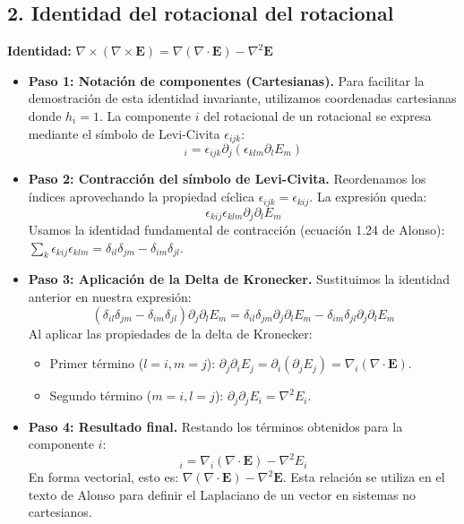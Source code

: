 \documentclass[a4paper]{article}
\begin{document}
\subsection*{2. Identidad del rotacional del rotacional}
\textbf{Identidad:} $\nabla \times (\nabla \times \mathbf{E}) = \nabla(\nabla \cdot \mathbf{E}) - \nabla^2 \mathbf{E}$

\begin{itemize}
    \item \textbf{Paso 1: Notación de componentes (Cartesianas).}
    Para facilitar la demostración de esta identidad invariante, utilizamos coordenadas cartesianas donde $h_i = 1$. La componente $i$ del rotacional de un rotacional se expresa mediante el símbolo de Levi-Civita $\epsilon_{ijk}$:
    \begin{equation}
        [\nabla \times (\nabla \times \mathbf{E})]_i = \epsilon_{ijk} \partial_j (\epsilon_{klm} \partial_l E_m)
    \end{equation}

    \item \textbf{Paso 2: Contracción del símbolo de Levi-Civita.}
    Reordenamos los índices aprovechando la propiedad cíclica $\epsilon_{ijk} = \epsilon_{kij}$. La expresión queda:
    \begin{equation}
        \epsilon_{kij} \epsilon_{klm} \partial_j \partial_l E_m
    \end{equation}
    Usamos la identidad fundamental de contracción (ecuación 1.24 de Alonso): $\sum_k \epsilon_{kij} \epsilon_{klm} = \delta_{il}\delta_{jm} - \delta_{im}\delta_{jl}$.

    \item \textbf{Paso 3: Aplicación de la Delta de Kronecker.}
    Sustituimos la identidad anterior en nuestra expresión:
    \begin{equation}
        (\delta_{il}\delta_{jm} - \delta_{im}\delta_{jl}) \partial_j \partial_l E_m = \delta_{il}\delta_{jm} \partial_j \partial_l E_m - \delta_{im}\delta_{jl} \partial_j \partial_l E_m
    \end{equation}
    Al aplicar las propiedades de la delta de Kronecker:
    \begin{itemize}
        \item Primer término ($l=i, m=j$): $\partial_j \partial_i E_j = \partial_i (\partial_j E_j) = \nabla_i (\nabla \cdot \mathbf{E})$.
        \item Segundo término ($m=i, l=j$): $\partial_j \partial_j E_i = \nabla^2 E_i$.
    \end{itemize}

    \item \textbf{Paso 4: Resultado final.}
    Restando los términos obtenidos para la componente $i$:
    \begin{equation}
        [\nabla \times (\nabla \times \mathbf{E})]_i = \nabla_i (\nabla \cdot \mathbf{E}) - \nabla^2 E_i
    \end{equation}
    En forma vectorial, esto es: $\nabla(\nabla \cdot \mathbf{E}) - \nabla^2 \mathbf{E}$. Esta relación se utiliza en el texto de Alonso para definir el Laplaciano de un vector en sistemas no cartesianos.
\end{itemize}
\end{document}
